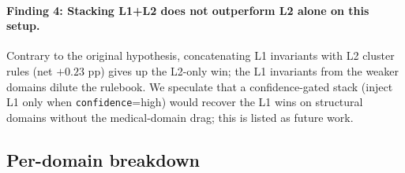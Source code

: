 \paragraph{Finding 4: Stacking L1+L2 does not outperform L2 alone
on this setup.} Contrary to the original hypothesis, concatenating
L1 invariants with L2 cluster rules (net $+0.23$ pp) gives up the
L2-only win; the L1 invariants from the weaker domains dilute the
rulebook. We speculate that a confidence-gated stack (inject L1
only when \texttt{confidence}=high) would recover the L1 wins on
structural domains without the medical-domain drag; this is listed
as future work.

\subsection{Per-domain breakdown}
\label{ssec:verb_perdomain}

